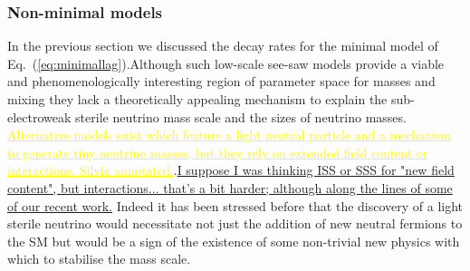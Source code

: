 \documentclass[11pt, a4paper]{article}
\newcommand{\refeq}[1]{Eq.~(\ref{#1})}
\def\ster{\ensuremath N}
\newcommand{\newtext}[2]{\textcolor{#1}{\ul{#2}}}
\begin{document}
\subsubsection{\label{sec:nonminimal}Non-minimal models}


In the previous section we discussed the decay rates for the minimal model of
\refeq{eq:minimallag}.Although such low-scale see-saw models provide a viable
and phenomenologically interesting region of parameter space for masses and
mixing they lack a theoretically appealing mechanism to explain the
sub-electroweak sterile neutrino mass scale and the sizes of neutrino masses.
\newtext{MARK}{Alternative models exist which feature a light neutral particle
and a mechanism to generate tiny neutrino masses, but they rely on extended
field content or interactions. Silvia annotated.}.\newtext{PB}{I suppose I was
thinking ISS or SSS for "new field content", but interactions... that's a bit
harder; although along the lines of some of our recent work.}
%
Indeed it has been stressed before \cite{delAguila:2008ir} that the discovery
of a light sterile neutrino would necessitate not just the addition of new
neutral fermions to the SM but would be a sign of the existence of some
non-trivial new physics with which to stabilise the mass scale.
 
\end{document}
